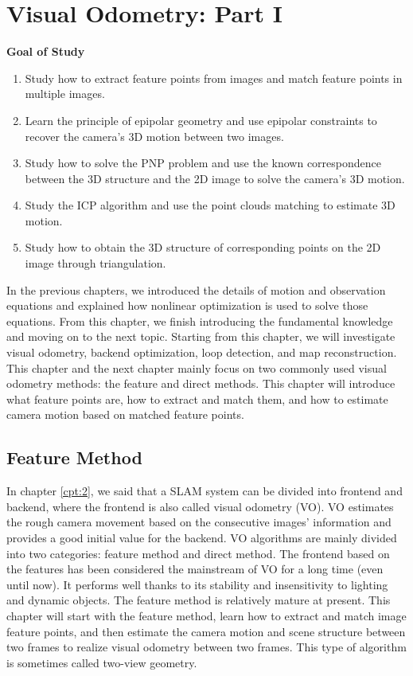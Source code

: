 \chapter{Visual Odometry: Part I}
\label{cpt:7}
\thispagestyle{empty}

\begin{mdframed}  
	\textbf{Goal of Study}
	\begin{enumerate}[labelindent=0em,leftmargin=1.5em]
		\item Study how to extract feature points from images and match feature points in multiple images.
		\item Learn the principle of epipolar geometry and use epipolar constraints to recover the camera's 3D motion between two images.
		\item Study how to solve the PNP problem and use the known correspondence between the 3D structure and the 2D image to solve the camera's 3D motion.	
		\item Study the ICP algorithm and use the point clouds matching to estimate 3D motion.
		\item Study how to obtain the 3D structure of corresponding points on the 2D image through triangulation.
	\end{enumerate}
\end{mdframed}

In the previous chapters, we introduced the details of motion and observation equations and explained how nonlinear optimization is used to solve those equations. From this chapter, we finish introducing the fundamental knowledge and moving on to the next topic. Starting from this chapter, we will investigate visual odometry, backend optimization, loop detection, and map reconstruction. This chapter and the next chapter mainly focus on two commonly used visual odometry methods: the feature and direct methods. This chapter will introduce what feature points are, how to extract and match them, and how to estimate camera motion based on matched feature points.

\newpage


\newpage

\section{Feature Method}
In chapter \ref{cpt:2}, we said that a SLAM system can be divided into frontend and backend, where the frontend is also called visual odometry (VO). VO estimates the rough camera movement based on the consecutive images' information and provides a good initial value for the backend. VO algorithms are mainly divided into two categories: feature method and direct method. The frontend based on the features has been considered the mainstream of VO for a long time (even until now). It performs well thanks to its stability and insensitivity to lighting and dynamic objects. The feature method is relatively mature at present. This chapter will start with the feature method, learn how to extract and match image feature points, and then estimate the camera motion and scene structure between two frames to realize visual odometry between two frames. This type of algorithm is sometimes called two-view geometry.

